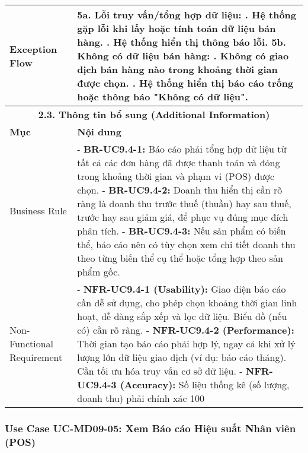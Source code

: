 \begin{longtable}{|m{4cm}|p{11cm}|}
\hline
Exception Flow & \textbf{5a. Lỗi truy vấn/tổng hợp dữ liệu:} \newline    1. Hệ thống gặp lỗi khi lấy hoặc tính toán dữ liệu bán hàng. \newline    2. Hệ thống hiển thị thông báo lỗi. \newline \textbf{5b. Không có dữ liệu bán hàng:} \newline    1. Không có giao dịch bán hàng nào trong khoảng thời gian được chọn. \newline    2. Hệ thống hiển thị báo cáo trống hoặc thông báo "Không có dữ liệu". \\
\hline
\multicolumn{2}{|c|}{\textbf{2.3. Thông tin bổ sung (Additional Information)}} \\
\hline
\textbf{Mục} & \textbf{Nội dung} \\
\hline
Business Rule & - \textbf{BR-UC9.4-1:} Báo cáo phải tổng hợp dữ liệu từ tất cả các đơn hàng đã được thanh toán và đóng trong khoảng thời gian và phạm vi (POS) được chọn. \newline - \textbf{BR-UC9.4-2:} Doanh thu hiển thị cần rõ ràng là doanh thu trước thuế (thuần) hay sau thuế, trước hay sau giảm giá, để phục vụ đúng mục đích phân tích. \newline - \textbf{BR-UC9.4-3:} Nếu sản phẩm có biến thể, báo cáo nên có tùy chọn xem chi tiết doanh thu theo từng biến thể cụ thể hoặc tổng hợp theo sản phẩm gốc. \\
\hline
Non-Functional Requirement & - \textbf{NFR-UC9.4-1 (Usability):} Giao diện báo cáo cần dễ sử dụng, cho phép chọn khoảng thời gian linh hoạt, dễ dàng sắp xếp và lọc dữ liệu. Biểu đồ (nếu có) cần rõ ràng. \newline - \textbf{NFR-UC9.4-2 (Performance):} Thời gian tạo báo cáo phải hợp lý, ngay cả khi xử lý lượng lớn dữ liệu giao dịch (ví dụ: báo cáo tháng). Cần tối ưu hóa truy vấn cơ sở dữ liệu. \newline - \textbf{NFR-UC9.4-3 (Accuracy):} Số liệu thống kê (số lượng, doanh thu) phải chính xác 100%
\hline
\end{longtable}

\subsubsection{Use Case UC-MD09-05: Xem Báo cáo Hiệu suất Nhân viên (POS)}

